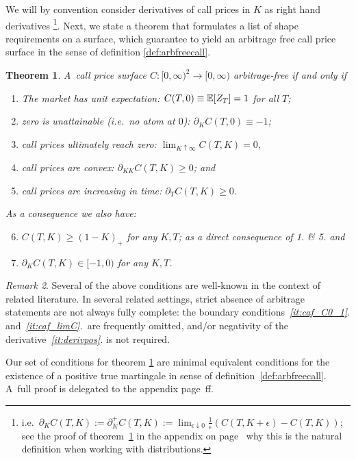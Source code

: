 \documentclass[twoside]{article}
\theoremstyle{plain}
\newtheorem{theorem}{Theorem}[section]        %
\theoremstyle{definition}
\theoremstyle{remark}
\newtheorem{remark}[theorem]{Remark}
\begin{document}
\noindent
We will by convention consider derivatives of call prices in $K$ as
right hand derivatives%
\footnote{
    i.e.~$\partial_K C(T,K) := \partial^+_K C(T,K) :=
    \lim_{\epsilon\downarrow 0} \frac1\epsilon ( C(T,K+\epsilon)-C(T,K) )$;
    see the proof of theorem~\ref{th:contarbfree} in the appendix on 
    page~\pageref{sec:appendix_absence} why this is the natural definition
    when working with distributions.}.
Next, we state a theorem that formulates a list of shape requirements on a surface, which guarantee to yield an arbitrage free call price surface in the sense of definition \ref{def:arbfreecall}.
\begin{theorem}\label{th:contarbfree}
    A~call price surface $C:[0,\infty)^2 \rightarrow [0,\infty)$ \emph{arbitrage-free} if and only if
    \begin{enumerate}
        \item The market has unit expectation: $C(T,0)\equiv \mathbb{E}[Z_T]=1$ for all $T$;\label{it:caf_C0_1} 
        
        \item zero is unattainable (i.e.~no atom at $0$): $\partial_K C(T,0)\equiv -1$;\label{it:caf_C1m1}
        \item call prices ultimately reach zero: $\lim_{K\uparrow \infty} C(T,K)=0$,\label{it:caf_limC}
        
        \item call prices are convex: $\partial_{KK} C(T,K) \geq 0$; and\label{it:caf_cvx}
        
        \item call prices are increasing in time: $\partial_T C(T,K)\geq 0$.\label{it:caf_dt}
    \end{enumerate}
    As a consequence we also have:
    \begin{enumerate}\setcounter{enumi}{5}
        \item $C(T,K) \geq (1-K)_+$ for any $K,T$; as a direct consequence of 1. \& 5. and
        \item $\partial_K C(T,K) \in [-1,0)$
        for any $K,T$.
        \label{it:derivpos}
    \end{enumerate}
\end{theorem}
\begin{remark}
Several of the above conditions are well-known in the context of related literature. 
In several related settings, strict absence of arbitrage statements are not always fully complete: the boundary conditions~\textit{\ref{it:caf_C0_1}.} and~\textit{\ref{it:caf_limC}.}~are frequently omitted, and/or negativity of the derivative~\textit{\ref{it:derivpos}.} is not required.

Our set of conditions for theorem \ref{th:contarbfree} are minimal equivalent conditions for the
existence of a positive true martingale in sense of definition~\ref{def:arbfreecall}.
A~full proof is delegated to the appendix page~\pageref{sec:appendix_absence}ff. 
\end{remark}
\end{document}

